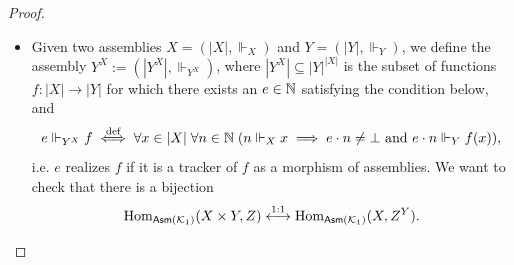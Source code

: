 \begin{proof}
\begin{itemize}
\[{        where $\mathbin{\dot{-}}$ is the dot-minus operation, and $\{z = \texttt{cons}(i,j)\}$ represents the corresponding truth value of the equality inside, which can be written via a primitive recursive function, see \cite{KomaraRecursiveFunctions2011}.}.\]
        These are all primitive recursive functions, and we will denote $\texttt{cons}(n,m)$ as $\langle n,m \rangle$ for brevity. We define
        \[ \langle n,m \rangle \Vdash_{X \times Y} (x,y) \overset{\textnormal{def}}{\iff} n \Vdash_X x \;\text{and}\; m \Vdash_Y y. \]
        The projections $\pi_X : X \times Y \to X$ and $\pi_Y : X \times Y \to Y$ are defined as the underlying functions $\pi_X(x,y) := x$ and $\pi_Y(x,y) := y$, and are morphisms of assemblies, since, for example,
        \[ \langle n, m \rangle \Vdash_{X \times Y} (x,y) \implies e \cdot \langle n, m \rangle \Vdash_X \pi_{X,Y}(x,y) = x, \]
        by taking $e := \ulcorner \texttt{car} \urcorner \in \NN$, and similarly for $\pi_{X,Y}'$.
        Given $f : Z \to X$ and $g : Z \to Y$, we define the morphism $\langle f,g \rangle : Z \to X \times Y$ as the underlying function $\langle f,g \rangle(z) := (f(z),g(z))$ that already is unique and makes the diagram commute.
        In order to have that $\langle f,g \rangle$ is a morphism of assemblies, we need to find a tracker such that
        \[ n \Vdash_Z z \implies e \cdot n \Vdash_{X \times Y} (f(z),g(z)), \]
        where the last condition is equivalent to $\texttt{car}(e \cdot n) \Vdash_X f(z)$ and $\texttt{cdr}(e \cdot n) \Vdash_Y g(z)$. Since $f$ and $g$ are morphisms we can fix two trackers $e_f$ and $e_g$ such that $e_f \cdot n \Vdash_X f(z)$ and $e_g \cdot n \Vdash_Y g(z)$,
        and we can define $e := \ulcorner \langle u_1(e_f,-),u_1(e_g,-) \rangle \urcorner \in \NN$, and it is easy to check that $e$ respects the two conditions above and that $e \cdot n \ne \bot$ whenever $n \Vdash_Z z$.
        \item Given two assemblies $X = (|X|,\Vdash_X)$ and $Y = (|Y|,\Vdash_Y)$, we define the assembly $Y^X := (|Y^X|,\Vdash_{Y^X})$, where $|Y^X| \subseteq |Y|^{|X|}$ is the subset of functions $f : |X| \to |Y|$ for which there exists an $e \in \mathbb{N}$ satisfying the condition below, and
        \[ e \Vdash_{Y^X} f \overset{\textnormal{def}}{\iff} \forall x \in |X| \; \forall n \in \mathbb{N} \; (n \Vdash_X x \implies e \cdot n \ne \bot \text{ and } e \cdot n \Vdash_Y f(x)),\]
        i.e. $e$ realizes $f$ if it is a tracker of $f$ as a morphism of assemblies. We want to check that there is a bijection
        \[ \operatorname{Hom}_{\mathsf{Asm}(\mathcal K_1)}(X \times Y,Z) \overset{1:1}{\longleftrightarrow} \operatorname{Hom}_{\mathsf{Asm}(\mathcal K_1)}(X,Z^Y). \]

\end{itemize}
\end{proof}
